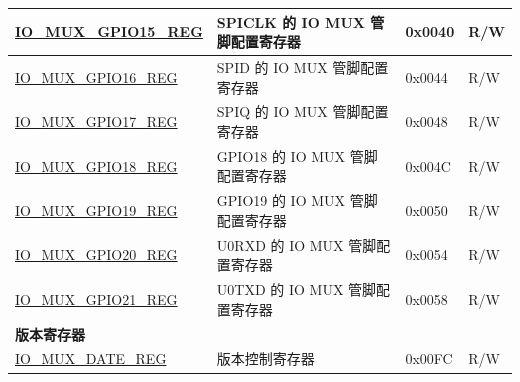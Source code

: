 \begin{longtable}{ | p{6cm} | p{7.2cm} | p{1.3cm} | p{1cm} | }
\hyperref[regdesc:IOMUXGPIONREG]{IO\_MUX\_GPIO15\_REG} & SPICLK 的 IO MUX 管脚配置寄存器 & 0x0040 & R/W \\ \hline
\hyperref[regdesc:IOMUXGPIONREG]{IO\_MUX\_GPIO16\_REG} & SPID 的 IO MUX 管脚配置寄存器 & 0x0044 & R/W \\ \hline
\hyperref[regdesc:IOMUXGPIONREG]{IO\_MUX\_GPIO17\_REG} & SPIQ 的 IO MUX 管脚配置寄存器 & 0x0048 & R/W \\ \hline
\hyperref[regdesc:IOMUXGPIONREG]{IO\_MUX\_GPIO18\_REG} & GPIO18 的 IO MUX 管脚配置寄存器 & 0x004C & R/W \\ \hline
\hyperref[regdesc:IOMUXGPIONREG]{IO\_MUX\_GPIO19\_REG} & GPIO19 的 IO MUX 管脚配置寄存器 & 0x0050 & R/W \\ \hline
\hyperref[regdesc:IOMUXGPIONREG]{IO\_MUX\_GPIO20\_REG} & U0RXD 的 IO MUX 管脚配置寄存器 & 0x0054 & R/W \\ \hline
\hyperref[regdesc:IOMUXGPIONREG]{IO\_MUX\_GPIO21\_REG} & U0TXD 的 IO MUX 管脚配置寄存器 & 0x0058 & R/W \\ \hline
\multicolumn{4}{|l|}{\textbf{版本寄存器}} \\ \hline
\hyperref[regdesc:IOMUXDATEREG]{IO\_MUX\_DATE\_REG} & 版本控制寄存器 & 0x00FC & R/W \\ \hline
\end{longtable}
